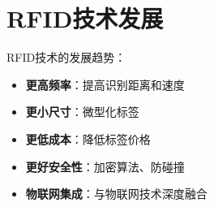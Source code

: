 \section{RFID技术发展}
\label{sec:rfid_development}

RFID技术的发展趋势：

\begin{itemize}
    \item \textbf{更高频率}：提高识别距离和速度
    \item \textbf{更小尺寸}：微型化标签
    \item \textbf{更低成本}：降低标签价格
    \item \textbf{更好安全性}：加密算法、防碰撞
    \item \textbf{物联网集成}：与物联网技术深度融合
\end{itemize}